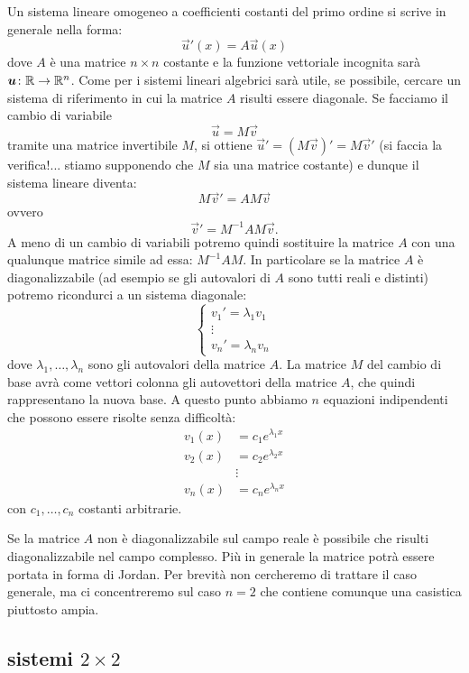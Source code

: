 Un sistema lineare omogeneo a coefficienti costanti del primo ordine si
scrive in generale nella forma:
\[
  \vec u'(x) = A \vec u(x)
\]
dove $A$ è una matrice $n\times n$ costante
e la funzione vettoriale incognita sarà
$\boldsymbol u \colon {\mathbb R}\to {\mathbb R}^n$.
Come per i sistemi lineari algebrici sarà utile, se possibile,
cercare un sistema di riferimento 
in cui la matrice $A$ risulti essere diagonale. Se facciamo il cambio di variabile
\[
  \vec u = M \vec v
\]
tramite una matrice invertibile $M$, si ottiene $\vec u' = (M \vec v)' = M \vec v'$
(si faccia la verifica!... stiamo supponendo che $M$ sia una matrice costante)
e dunque il sistema lineare diventa:
\[
 M \vec v' = A M \vec v
\]
ovvero
\[
  \vec v' = M^{-1} A M \vec v.
\]
A meno di un cambio di variabili potremo quindi sostituire la matrice $A$
con una qualunque matrice simile ad essa: $M^{-1} A M$. In particolare se
la matrice $A$ è diagonalizzabile (ad esempio se gli autovalori di $A$ sono
tutti reali e distinti)
potremo ricondurci a un sistema diagonale:
\[
\begin{cases}
 v_1' = \lambda_1 v_1 \\
      \vdots\\
 v_n' = \lambda_n v_n
\end{cases}
\]
dove $\lambda_1, \dots, \lambda_n$ sono gli autovalori della matrice $A$.
La matrice $M$ del cambio di base avrà come vettori colonna gli autovettori
della matrice $A$, che quindi rappresentano la nuova base. A questo punto
abbiamo $n$ equazioni indipendenti che possono essere risolte
senza difficoltà:
\begin{align*}
  v_1(x) &= c_1 e^{\lambda_1 x}\\
  v_2(x) &= c_2 e^{\lambda_2 x}\\
  &\vdots \\
  v_n(x) &= c_n e^{\lambda_n x}
\end{align*}
con $c_1, \dots, c_n$ costanti arbitrarie.

Se la matrice $A$ non è diagonalizzabile sul campo reale è possibile che
risulti diagonalizzabile nel campo complesso. Più in generale la matrice
potrà essere portata in forma di Jordan. Per brevità non cercheremo di
trattare il caso generale, ma ci concentreremo sul caso $n=2$ che
contiene comunque una casistica piuttosto ampia.

\subsection{sistemi $2\times 2$}

